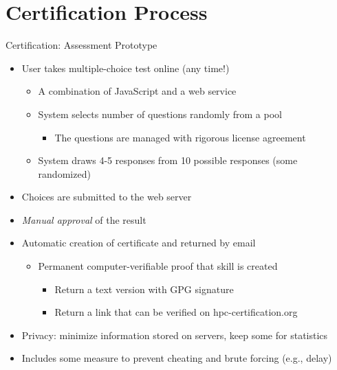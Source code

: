 \documentclass[compress,aspectratio=169]{beamer}
\begin{document}
\section{Certification Process}
\begin{frame}{Certification: Assessment Prototype}
		\begin{itemize}
			\item[\color{readingRed}{1.}] User takes multiple-choice test online (any time!)
			\begin{itemize}
				\item A combination of JavaScript and a web service
				\item System selects number of questions randomly from a pool
					\begin{itemize}
						\item The questions are managed with rigorous license agreement
					\end{itemize}
				\item System draws 4-5 responses from 10 possible responses (some randomized)
			\end{itemize}
			\item[\color{readingRed}{2.}] Choices are submitted to the web server
			\item[\color{readingRed}{3.}] \textit{Manual approval} of the result
			\item[\color{readingRed}{4.}] Automatic creation of certificate and returned by email
			\begin{itemize}
							\item Permanent computer-verifiable proof that skill is created
							\begin{itemize}
								\item Return a text version with GPG signature
								\item Return a link that can be verified on hpc-certification.org
							\end{itemize}
			\end{itemize}
			\item Privacy: minimize information stored on servers, keep some for statistics
			\item Includes some measure to prevent cheating and brute forcing (e.g., delay)
		\end{itemize}
\end{frame}
\end{document}
